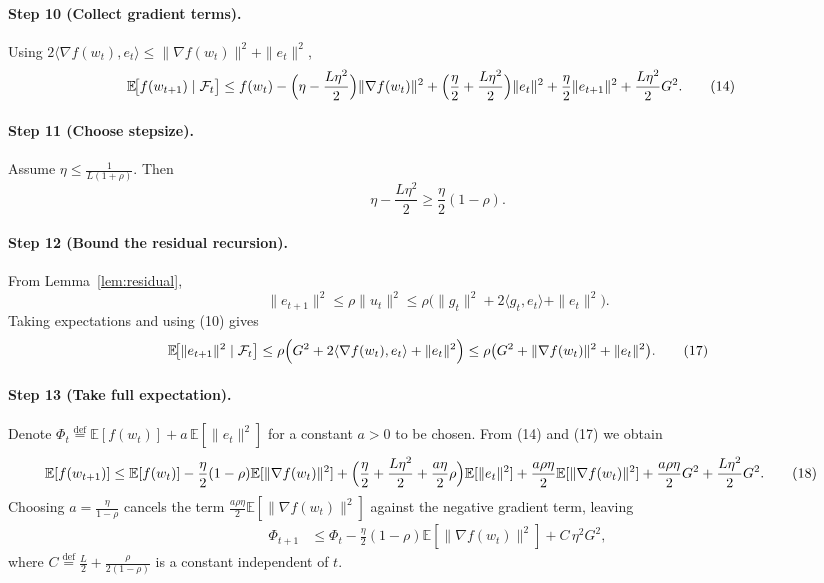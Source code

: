 \documentclass{article}
\newcommand{\E}{\mathbb{E}}
\begin{document}
\paragraph{Step 10 (Collect gradient terms).}
Using $2\langle\nabla f(w_t),e_t\rangle\le\|\nabla f(w_t)\|^{2}+\|e_t\|^{2}$,
\begin{align}
\E\!\bigl[f(w_{t+1})\mid\mathcal{F}_t\bigr]
&\le f(w_t)-\Bigl(\eta-\frac{L\eta^{2}}{2}\Bigr)\|\nabla f(w_t)\|^{2}
+\Bigl(\frac{\eta}{2}+\frac{L\eta^{2}}{2}\Bigr)\|e_t\|^{2}
+\frac{\eta}{2}\|e_{t+1}\|^{2}
+\frac{L\eta^{2}}{2}G^{2}.
\tag{14}
\end{align}
\paragraph{Step 11 (Choose stepsize).}
Assume $\eta\le\frac{1}{L(1+\rho)}$.  Then
\[
\eta-\frac{L\eta^{2}}{2}\ge\frac{\eta}{2}(1-\rho).
\tag{15}
\]
\paragraph{Step 12 (Bound the residual recursion).}
From Lemma~\ref{lem:residual},
\[
\|e_{t+1}\|^{2}\le\rho\|u_t\|^{2}\le\rho\bigl(\|g_t\|^{2}+2\langle g_t,e_t\rangle+\|e_t\|^{2}\bigr).
\tag{16}
\]
Taking expectations and using (10) gives
\[
\E\!\bigl[\|e_{t+1}\|^{2}\mid\mathcal{F}_t\bigr]
\le\rho\Bigl(G^{2}+2\langle\nabla f(w_t),e_t\rangle+\|e_t\|^{2}\Bigr)
\le\rho\bigl(G^{2}+\|\nabla f(w_t)\|^{2}+\|e_t\|^{2}\bigr).
\tag{17}
\]
\paragraph{Step 13 (Take full expectation).}
Denote $\Phi_t\stackrel{\text{def}}{=}\E[f(w_t)]+a\,\E[\|e_t\|^{2}]$ for a constant $a>0$ to be chosen.
From (14) and (17) we obtain
\begin{align}
\E[f(w_{t+1})]
&\le \E[f(w_t)]-\frac{\eta}{2}(1-\rho)\E[\|\nabla f(w_t)\|^{2}]
+ \Bigl(\frac{\eta}{2}+\frac{L\eta^{2}}{2}+\frac{a\eta}{2}\rho\Bigr)\E[\|e_t\|^{2}]
+\frac{a\rho\eta}{2}\E[\|\nabla f(w_t)\|^{2}]
+\frac{a\rho\eta}{2}G^{2}
+\frac{L\eta^{2}}{2}G^{2}.
\tag{18}
\end{align}
Choosing $a=\frac{\eta}{1-\rho}$ cancels the term $\frac{a\rho\eta}{2}\E[\|\nabla f(w_t)\|^{2}]$ against the negative gradient term, leaving
\begin{align}
\Phi_{t+1}
&\le \Phi_{t}
-\frac{\eta}{2}(1-\rho)\E[\|\nabla f(w_t)\|^{2}]
+ C\,\eta^{2}G^{2},
\tag{19}
\end{align}
where $C\stackrel{\text{def}}{=}\frac{L}{2}+\frac{\rho}{2(1-\rho)}$ is a constant independent of $t$.
\end{document}
